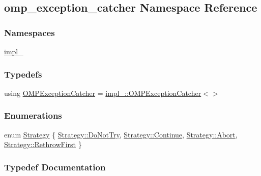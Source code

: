 \hypertarget{namespaceomp__exception__catcher}{}\subsection{omp\+\_\+exception\+\_\+catcher Namespace Reference}
\label{namespaceomp__exception__catcher}
\subsubsection*{Namespaces}
\begin{DoxyCompactItemize}
\item 
 \hyperlink{namespaceomp__exception__catcher_1_1impl__}{impl\+\_\+}
\end{DoxyCompactItemize}
\subsubsection*{Typedefs}
\begin{DoxyCompactItemize}
\item 
using \hyperlink{namespaceomp__exception__catcher_ad61d95729373b0e8ffbabdfcde3ecb61}{O\+M\+P\+Exception\+Catcher} = \hyperlink{classomp__exception__catcher_1_1impl___1_1OMPExceptionCatcher}{impl\+\_\+\+::\+O\+M\+P\+Exception\+Catcher}$<$$>$
\end{DoxyCompactItemize}
\subsubsection*{Enumerations}
\begin{DoxyCompactItemize}
\item 
enum \hyperlink{namespaceomp__exception__catcher_a70d1436a7f1714534deeb94daeee3517}{Strategy} \{ \hyperlink{namespaceomp__exception__catcher_a70d1436a7f1714534deeb94daeee3517a7b2e9a6112ae937175819b661a4c0c67}{Strategy\+::\+Do\+Not\+Try}, 
\hyperlink{namespaceomp__exception__catcher_a70d1436a7f1714534deeb94daeee3517aa0bfb8e59e6c13fc8d990781f77694fe}{Strategy\+::\+Continue}, 
\hyperlink{namespaceomp__exception__catcher_a70d1436a7f1714534deeb94daeee3517a727b63583e01fa2b3952dab580c84dc2}{Strategy\+::\+Abort}, 
\hyperlink{namespaceomp__exception__catcher_a70d1436a7f1714534deeb94daeee3517a10308abc2313a8ec42d67a45a0122860}{Strategy\+::\+Rethrow\+First}
 \}
\end{DoxyCompactItemize}


\subsubsection{Typedef Documentation}
